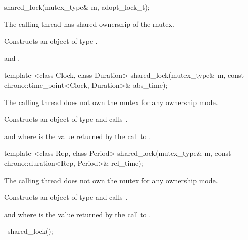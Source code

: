%
\begin{itemdecl}
shared_lock(mutex_type& m, adopt_lock_t);
\end{itemdecl}

\begin{itemdescr}
\pnum
\requires The calling thread has shared ownership of the mutex.

\pnum
\effects Constructs an object of type .

\pnum
\postconditions {} and .
\end{itemdescr}

%
\begin{itemdecl}
template <class Clock, class Duration>
  shared_lock(mutex_type& m,
              const chrono::time_point<Clock, Duration>& abs_time);
\end{itemdecl}

\begin{itemdescr}
\pnum
\requires The calling thread does not own the mutex for any ownership mode.

\pnum
\effects Constructs an object of type  and calls
.

\pnum
\postconditions {} and 
where 
is the value returned by the call to .
\end{itemdescr}

%
\begin{itemdecl}
template <class Rep, class Period>
  shared_lock(mutex_type& m,
              const chrono::duration<Rep, Period>& rel_time);
\end{itemdecl}

\begin{itemdescr}
\pnum
\requires The calling thread does not own the mutex for any ownership mode.

\pnum
\effects Constructs an object of type  and calls
.

\pnum
\postconditions {} and 
where  is
the value returned by the call to .
\end{itemdescr}

%
\begin{itemdecl}
~shared_lock();
\end{itemdecl}

